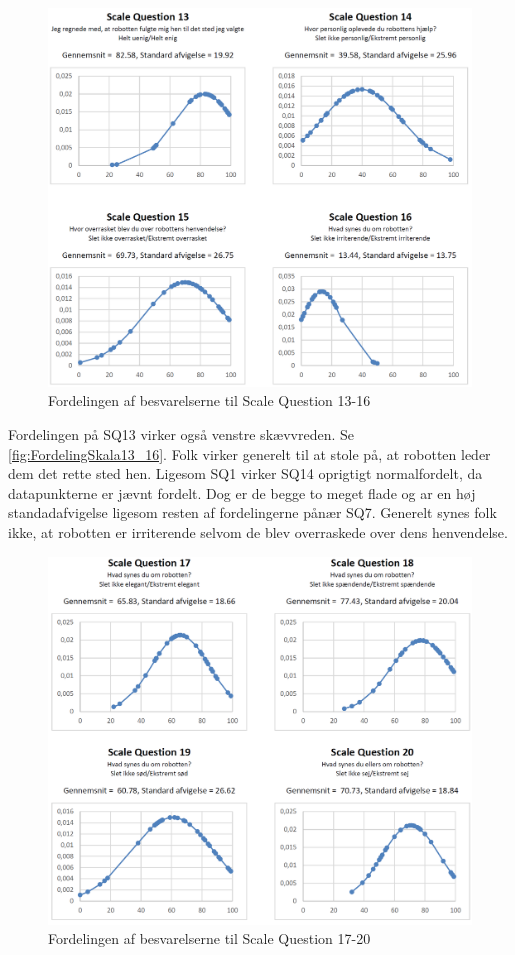 \begin{figure}[H]
\centering
\includegraphics[width =\textwidth]{Figure/DatabehandlingSkalaer/FordelingSkala13_16} 
\caption{Fordelingen af besvarelserne til Scale Question 13-16}
\label{fig:FordelingSkala13_16}
\end{figure}
\noindent

Fordelingen på SQ13 virker også venstre skævvreden. Se \autoref{fig:FordelingSkala13_16}. Folk virker generelt til at stole på, at robotten leder dem det rette sted hen. Ligesom SQ1 virker SQ14 oprigtigt normalfordelt, da datapunkterne er jævnt fordelt. Dog er de begge to meget flade og ar en høj standadafvigelse ligesom resten af fordelingerne pånær SQ7. Generelt synes folk ikke, at robotten er irriterende selvom de blev overraskede over dens henvendelse. 

\begin{figure}[H]
\centering
\includegraphics[width =\textwidth]{Figure/DatabehandlingSkalaer/FordelingSkala17_20} 
\caption{Fordelingen af besvarelserne til Scale Question 17-20}
\label{fig:FordelingSkala17_20}
\end{figure}
\noindent

